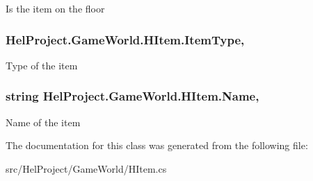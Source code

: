 Is the item on the floor 

\hypertarget{class_hel_project_1_1_game_world_1_1_h_item_aeeb877e7d0f3aa3adf04c17c67bb385f}{}
\subsubsection[{Item\+Type}]{ Hel\+Project.\+Game\+World.\+H\+Item.\+Item\+Type\hspace{0.3cm}{\ttfamily [get]}, {\ttfamily [set]}}\label{class_hel_project_1_1_game_world_1_1_h_item_aeeb877e7d0f3aa3adf04c17c67bb385f}


Type of the item 

\hypertarget{class_hel_project_1_1_game_world_1_1_h_item_ad6e286a2833c7a01297544008e6e9e67}{}
\subsubsection[{Name}]{\setlength{\rightskip}{0pt plus 5cm}string Hel\+Project.\+Game\+World.\+H\+Item.\+Name\hspace{0.3cm}{\ttfamily [get]}, {\ttfamily [set]}}\label{class_hel_project_1_1_game_world_1_1_h_item_ad6e286a2833c7a01297544008e6e9e67}


Name of the item 



The documentation for this class was generated from the following file\+:\begin{DoxyCompactItemize}
\item 
src/\+Hel\+Project/\+Game\+World/H\+Item.\+cs\end{DoxyCompactItemize}
